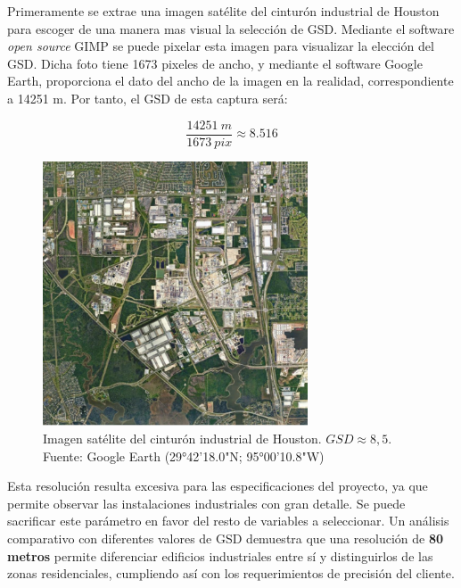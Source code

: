 Primeramente se extrae una imagen satélite del cinturón industrial de Houston para escoger de una manera mas visual la selección de GSD. Mediante el software \textit{open source} GIMP se puede pixelar esta imagen para visualizar la elección del GSD. Dicha foto tiene 1673 pixeles de ancho, y mediante el software Google Earth, proporciona el dato del ancho de la imagen en la realidad, correspondiente a 14251 m. Por tanto, el GSD de esta captura será: 

\begin{equation}
\frac{14251\ m}{1673\ pix} \approx 8.516
\end{equation}


\begin{figure}[H]
    \centering
    \includegraphics[width=0.7\textwidth]{4.Payload/Houston.jpg}
    \caption{Imagen satélite del cinturón industrial de Houston. $GSD \approx 8,5$. \\ Fuente: Google Earth (29°42'18.0"N; 95°00'10.8"W)}
    \label{fig:Houston}
\end{figure}

Esta resolución resulta excesiva para las especificaciones del proyecto, ya que permite observar las instalaciones industriales con gran detalle. Se puede sacrificar este parámetro en favor del resto de variables a seleccionar. Un análisis comparativo con diferentes valores de GSD demuestra que una resolución de \textbf{80 metros} permite diferenciar edificios industriales entre sí y distinguirlos de las zonas residenciales, cumpliendo así con los requerimientos de precisión del cliente.

